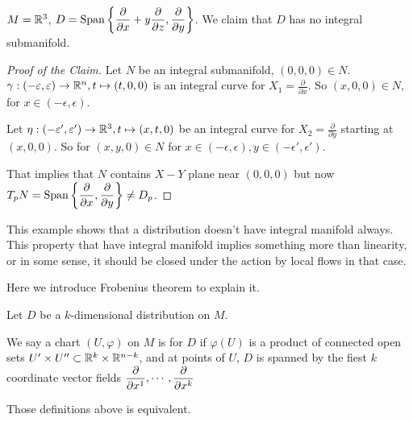 \begin{example}
     $ M=\mathbb R^3 $,  $ D=\mathrm{Span}\left\{\displaystyle\frac{\partial}{\partial x}+y\frac{\partial }{\partial z},\frac{\partial }{\partial y}\right\} $. We claim that  $ D  $ has no integral submanifold.  
    
\end{example}
\begin{proof}[Proof of the Claim]
    Let  $ N  $ be an integral submanifold,  $ (0,0,0)\in N $.  $ \gamma:
    (-\varepsilon,\varepsilon)\rightarrow \mathbb R^n,t\mapsto (t,0,0) $ is an  integral curve for  $ X_1=\frac{\partial}{\partial x}$. So  $ (x,0,0)\in N $, for  $ x\in (-\epsilon,\epsilon) $.
    
    Let  $ \eta:(-\varepsilon',\varepsilon')\rightarrow \mathbb R^3,t\mapsto (x,t,0) $ be an integral curve for  $ X_2=\frac{\partial}{\partial y} $ starting at  $ (x,0,0) $. So for  $ (x,y,0) \in N$ for  $ x\in(-\epsilon,\epsilon),y\in(-\epsilon',\epsilon') $.
    
    That implies that  $ N  $ contains  $ X-Y $ plane near  $ (0,0,0) $ but now  $ T_pN=\mathrm{Span}\displaystyle\left\{\frac{\partial }{\partial x},\frac{\partial}{\partial y}\right\}\neq D_p $.   
\end{proof}
\begin{remark}
    This example shows that a distribution doesn't have integral manifold always. This property that have integral manifold implies something more than linearity, or in some sense, it should be closed under the action by local flows in that case.

    Here we introduce Frobenius theorem to explain it.
\end{remark}
\begin{definition}
    Let  $ D  $ be a  $ k $-dimensional distribution on  $ M $.
    
    We say a chart  $ (U,\varphi) $ on  $ M  $ is  for  $ D $ if  $ \varphi(U) $ is a product of connected open sets  $ U'\times U''\subset \mathbb R^k\times \mathbb R^{n-k} $, and at points of  $ U $,  $ D  $ is spanned by the fiest  $ k $ coordinate vector fields  $\displaystyle \frac{\partial}{\partial x^1},\cdots,\frac{\partial}{\partial x^k} $   
\end{definition}
\begin{theorem}\label{thm:local-frobenius}
    Those definitions above is equivalent.
\end{theorem}
